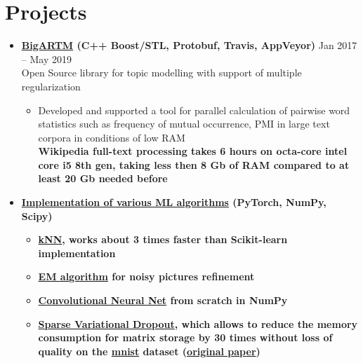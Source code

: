 \documentclass[letterpaper,11pt]{article}
\newcommand{\resumeSubHeadingListStart}{\begin{itemize}[leftmargin=*]}
\newcommand{\resumeSubHeadingListEnd}{\end{itemize}}
\begin{document}
\section{Projects}
\resumeSubHeadingListStart
    \item{
      \textbf{{\href{https://github.com/bigartm/bigartm}{\color{blue} BigARTM} (C++ Boost/STL, Protobuf, Travis, AppVeyor)}}
      \hfill
      Jan 2017 -- May 2019
    } \\
    Open Source library for topic modelling with support of multiple regularization \\
    \vspace{-6pt}
    \begin{itemize}
      \item Developed and supported a tool for parallel calculation of pairwise word statistics such as frequency of mutual occurrence, PMI in large text corpora in conditions of low RAM \\
      \textbf{Wikipedia full-text processing takes 6 hours on octa-core intel core i5 8th gen, taking less then 8 Gb of RAM compared to at least 20 Gb needed before}
    \end{itemize}
    \vspace{-14pt}
    \item{
      \textbf{\href{https://github.com/MichaelSolotky/sandbox/tree/master/Machine_Learning}{\color{blue} Implementation of various ML algorithms} (PyTorch, NumPy, Scipy)} \\
      \vspace{-6pt}
      \begin{itemize}
      \item {\bf \href{https://github.com/MichaelSolotky/sandbox/tree/master/Machine_Learning/kNN_classifier}{kNN}, works about 3 times faster than Scikit-learn implementation} \\
      \vspace{-1pt}
      \item {\bf \href{https://github.com/MichaelSolotky/sandbox/tree/master/Machine_Learning/Bayesian_methods/Prak_2_EM_algorithm_for_mixtures}{EM algorithm} for noisy pictures refinement}
      \vspace{-2pt}
      \item {\bf \href{https://github.com/MichaelSolotky/sandbox/tree/master/Machine_Learning/Backprop}{Convolutional Neural Net} from scratch in NumPy}
      \vspace{-2pt}
      \item {\bf \href{https://github.com/MichaelSolotky/sandbox/tree/master/Machine_Learning/Bayesian_deep_learning/Lab_1_Normalizing_flows}{Sparse Variational Dropout}, which allows to reduce the memory consumption for matrix storage by 30 times without loss of quality on the \href{http://yann.lecun.com/exdb/mnist/}{mnist} dataset (\href{https://arxiv.org/abs/1701.05369}{original paper})}
    \end{itemize}
    }
  \resumeSubHeadingListEnd
\end{document}
